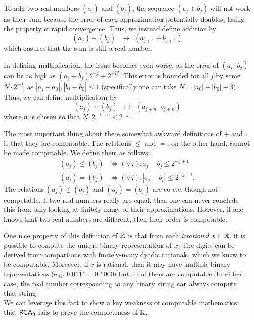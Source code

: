 \documentclass{amsart}
\begin{document}
	To add two real numbers $(a_j)$ and $(b_j)$, the sequence $(a_j+b_j)$ will not work as their sum because the error of each approximation potentially doubles, losing the property of rapid convergence. Thus, we instead define addition by
	$$
	(a_j) + (b_j) \;\;\, \mapsto \;\, (a_{j+1}+b_{j+1})
	$$
	which ensures that the sum is still a real number.
	
	In defining multiplication, the issue becomes even worse, as the error of $(a_j\cdot b_j)$ can be as high as $(a_j+b_j)2^{-j} + 2^{-2j}$. This error is bounded for all $j$ by some $N\cdot 2^{-j}$, as $|a_j-a_0|,|b_j-b_0|\leq 1$ (specifically one can take $N=|a_0|+|b_0|+3$). Thus, we can define multiplication by
	$$
	(a_j) \,\, \cdot \,\,(b_j) \;\;\, \mapsto \;\, (a_{j+n}\cdot b_{j+n})
	$$
	where $n$ is chosen so that $N\cdot 2^{-j-n} < 2^{-j}$.
	
	The most important thing about these somewhat awkward definitions of $+$ and $\cdot$ is that they are computable. The relations $\leq$ and $=$, on the other hand, cannot be made computable. We define them as follows:
	\begin{align*}
		(a_j) \leq  (b_j) &\iff (\forall j): a_j - b_j \leq 2^{-j+1}\\
		(a_j) = (b_j) &\iff (\forall j):|a_j-b_j|\leq 2^{-j+1}.
	\end{align*}
	The relations $(a_j)\leq (b_j)$ and $(a_j)= (b_j)$ are co-c.e. though not computable. If two real numbers really are equal, then one can never conclude this from only looking at finitely-many of their approximations. However, if one knows that two real numbers are different, then their order is computable.
	
	One nice property of this definition of $\mathbb{R}$ is that from each \textit{irrational} $x\in \mathbb{R}$, it is possible to compute the unique binary representation of $x$. The digits can be derived from comparisons with finitely-many dyadic rationals, which we know to be computable. Moreover, if $x$ is rational, then it may have multiple binary representations (e.g. $0.0\overline{111}=0.1000$) but all of them are computable. In either case, the real number corresponding to any binary string can always compute that string.\\
	
	We can leverage this fact to show a key weakness of computable mathematics: that $\operatorname{\sf{RCA_0}}$ fails to prove the completeness of $\mathbb{R}$.\\
	
\end{document}
